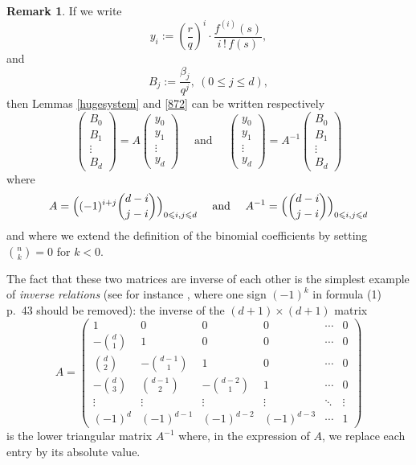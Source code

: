 \documentclass[10pt]{article}
\theoremstyle{definition}
\newtheorem{remark}[theorem]{Remark}
\numberwithin{equation}{section}
\begin{document}
\begin{remark} 
If we write 
\begin{equation*}
y_i:= \left( \frac rq\right)^i\cdot \frac{f^{(i)}(s)}{i\, !\, f(s)},
\end{equation*}
and
\begin{equation*}
B_j := \frac{ \beta_{j}}{q^j}, \ (0\leqslant j \leqslant d),
\end{equation*}
then Lemmas \ref{hugesystem} and \ref{872} can be written respectively 
\begin{equation}\label{B=Ay}
 \begin{pmatrix} B_0\\ B_1\\
 \vdots \\ 
 B_d
 \end{pmatrix} =
 A
 \begin{pmatrix}y_0\\ y_1\\ \vdots \\ y_d
 \end{pmatrix}
 \quad\text{ and } \quad
 \begin{pmatrix}y_0\\ y_1\\ \vdots \\ y_d
 \end{pmatrix}=
 A^{-1}
 \begin{pmatrix} B_0\\ B_1\\
 \vdots \\ 
 B_d
 \end{pmatrix} 
\end{equation}
 where 
\begin{equation}\label{defAA-1}
 A=
 \Bigl(
 (-1)^{i+j} \binom{d-i}{j-i}\Bigr)_{0\leqslant i,j\leqslant d}
 \quad\text{ and }\quad
 A^{-1}=
 \Bigl(
 \binom{d-i}{j-i}\Bigr)_{0\leqslant i,j\leqslant d}
\end{equation}
and where we extend the definition of the binomial coefficients by setting $\binom n k=0$ for $k<0$.
 
The fact that these two matrices are inverse of each other is the simplest example of {\em inverse relations} (see for instance \cite[p.43--45]{Ri}, where one sign $(-1)^k$ in formula (1) p.~43 should be removed): 
 the inverse of the $(d+1)\times(d+1)$ matrix 
\[
A=\begin{pmatrix}
1&0&0&0&\cdots&0
\\
\displaystyle -\binom d 1&1&0&0&\cdots&0
\\
\displaystyle \binom d 2&\displaystyle -\binom {d-1} 1 &1&0&\cdots&0
\\
\displaystyle -\binom d 3&\displaystyle \binom {d-1}2&\displaystyle - \binom {d-2}1&1&\cdots&0
\\
\vdots&\vdots&\vdots&\vdots&\ddots&\vdots
\\
(-1)^d&(-1)^{d-1}&(-1)^{d-2}&(-1)^{d-3}&\cdots&1
\end{pmatrix}
\] 
is the lower triangular matrix $A^{-1}$ where, in the expression of $A$, we replace each entry by its absolute value.
\end{remark}
\end{document}
